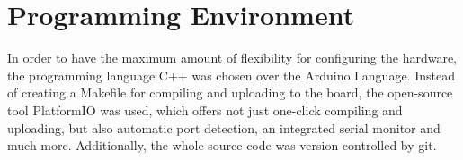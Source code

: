 \section{Programming Environment}

In order to have the maximum amount of flexibility for configuring the hardware, the programming language C++ was chosen over the Arduino Language. Instead of creating a Makefile for compiling and uploading to the board, the open-source tool PlatformIO was used, which offers not just one-click compiling and uploading, but also automatic port detection, an integrated serial monitor and much more. Additionally, the whole source code was version controlled by git.
